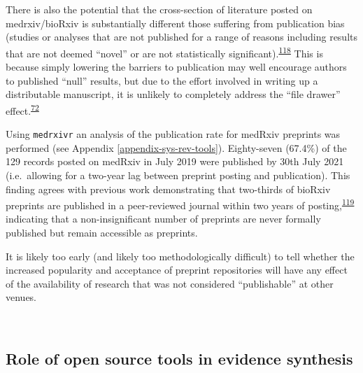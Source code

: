 \documentclass[a4paper, twoside]{templates/ociamthesis}
\begin{document}
There is also the potential that the cross-section of literature posted on medrxiv/bioRxiv is substantially different those suffering from publication bias (studies or analyses that are not published for a range of reasons including results that are not deemed ``novel'' or are not statistically significant).\textsuperscript{\protect\hyperlink{ref-song2010}{118}} This is because simply lowering the barriers to publication may well encourage authors to published ``null'' results, but due to the effort involved in writing up a distributable manuscript, it is unlikely to completely address the ``file drawer'' effect.\textsuperscript{\protect\hyperlink{ref-rosenthal1979}{72}}

Using \texttt{medrxivr} an analysis of the publication rate for medRxiv preprints was performed (see Appendix \ref{appendix-sys-rev-tools}). Eighty-seven (67.4\%) of the 129 records posted on medRxiv in July 2019 were published by 30th July 2021 (i.e.~allowing for a two-year lag between preprint posting and publication). This finding agrees with previous work demonstrating that two-thirds of bioRxiv preprints are published in a peer-reviewed journal within two years of posting,\textsuperscript{\protect\hyperlink{ref-abdill2019b}{119}} indicating that a non-insignificant number of preprints are never formally published but remain accessible as preprints.

It is likely too early (and likely too methodologically difficult) to tell whether the increased popularity and acceptance of preprint repositories will have any effect of the availability of research that was not considered ``publishable'' at other venues.

~

\hypertarget{role-of-open-source-tools-in-evidence-synthesis}{%
\subsection{Role of open source tools in evidence synthesis}\label{role-of-open-source-tools-in-evidence-synthesis}}
\end{document}
